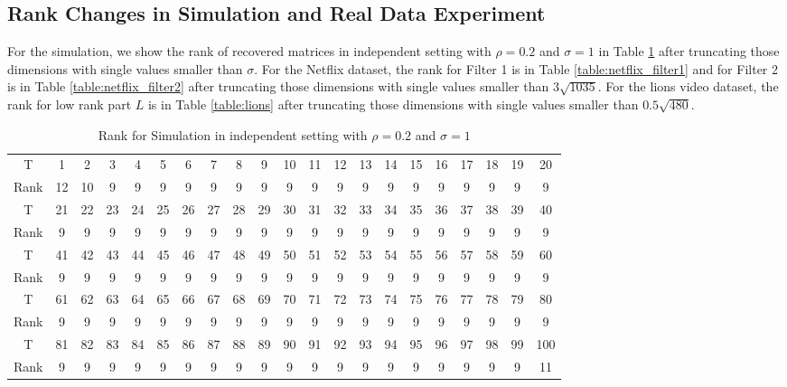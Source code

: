 \documentclass[12pt]{article}
\begin{document}
\subsection{Rank Changes in Simulation and Real Data Experiment}
\label{supp:rank}
For the simulation, we show the rank of recovered matrices in independent setting with $\rho = 0.2$ and $\sigma= 1$ in Table \ref{table:simulation} after truncating those dimensions with single values smaller than $\sigma$. For the Netflix dataset, the rank for Filter 1 is in Table \ref{table:netflix_filter1} and for Filter 2 is in Table \ref{table:netflix_filter2} after truncating those dimensions with single values smaller than $3\sqrt{1035}$. For the lions video dataset, the rank for low rank part $L$ is in Table \ref{table:lions} after truncating those dimensions with single values smaller than $0.5\sqrt{480}$.

\begin{table}[!ht]
    \centering
    \caption{Rank for Simulation in independent setting with $\rho = 0.2 $ and $\sigma= 1$}
    \label{table:simulation}
    \begin{tabular}{c|c|c|c|c|c|c|c|c|c|c|c|c|c|c|c|c|c|c|c|c}
    \hline
     T & 1&2 &3 &4 &5 & 6 & 7& 8 & 9 & 10&  11  & 12&   13&   14&   15&   16&   17 &  18 &  19  & 20\\
     Rank & 12 & 10 & 9 & 9 & 9 & 9 & 9 & 9 & 9 & 9& 9 & 9& 9 & 9 & 9 & 9 & 9 & 9 & 9 & 9\\
     \hline
    T & 21 &  22  & 23&   24 &  25 &  26 &  27 &  28  & 29 &  30  & 31 &  32 &  33  & 34 &  35&   36&   37 & 38  & 39 &  40 \\
     Rank  & 9 & 9& 9 & 9 & 9 & 9 & 9 & 9 & 9 & 9& 9 & 9& 9 & 9 & 9 & 9 & 9 & 9 & 9 & 9 \\
     \hline
    T &41  & 42&   43 &  44 &  45  & 46  & 47  & 48 &  49 &  50 &  51  & 52& 
 53 &  54  & 55  & 56 &  57 &  58 &  59 &  60  \\
 Rank  & 9 & 9& 9 & 9 & 9 & 9 & 9 & 9 & 9 & 9& 9 & 9& 9 & 9 & 9 & 9 & 9 & 9 & 9 & 9 \\
  \hline
T & 61 &  62  & 63 &  64 &  65 &  66 &  67 &  68  & 69&   70  & 71  & 72 &  73 &  74 &  75 &  76  & 77 &  78 &  79  & 80 \\
  Rank & 9 & 9& 9 & 9 & 9 & 9 & 9 & 9 & 9 & 9& 9 & 9& 9 & 9 & 9 & 9 & 9 & 9 & 9 & 9\\
 \hline
T &  81 &  82&   83 &  84  & 85 &  86 &  87  & 88 &  89 &  90 &  91 &  92 &  93&   94 &  95 &  96&   97 &  98 &  99 & 100\\
  Rank& 9 & 9& 9 & 9 & 9 & 9 & 9 & 9 & 9 & 9  & 9 & 9& 9 & 9 & 9 & 9 & 9 & 9 & 9& 11\\
   \hline
    \end{tabular}
\end{table}
\end{document}
